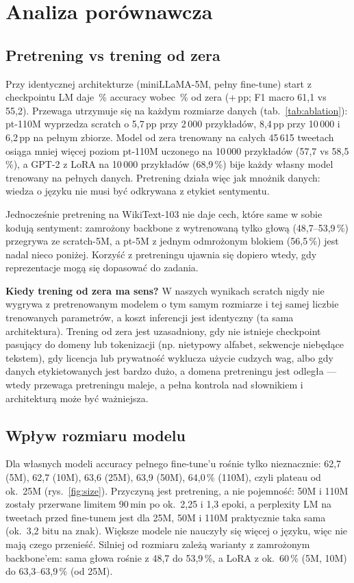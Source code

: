 \documentclass[11pt,a4paper]{article}
\begin{document}
\section{Analiza porównawcza}

\subsection{Pretrening vs trening od zera}
Przy identycznej architekturze (miniLLaMA-5M, pełny fine-tune) start z checkpointu LM daje
\resptFiveFullAcc\,\% accuracy wobec \resscratchAcc\,\% od zera (+\resgainPretrain\,pp; F1 macro 61,1
vs 55,2). Przewaga utrzymuje się na każdym rozmiarze danych (tab.~\ref{tab:ablation}): pt-110M
wyprzedza scratch o 5,7\,pp przy 2\,000 przykładów, 8,4\,pp przy 10\,000 i 6,2\,pp na pełnym zbiorze.
Model od zera trenowany na całych 45\,615 tweetach osiąga mniej więcej poziom pt-110M uczonego na
10\,000 przykładów (57,7 vs 58,5\,\%), a GPT-2 z LoRA na 10\,000 przykładów (68,9\,\%) bije każdy
własny model trenowany na pełnych danych. Pretrening działa więc jak mnożnik danych: wiedza
o języku nie musi być odkrywana z etykiet sentymentu.

Jednocześnie pretrening na WikiText-103 nie daje cech, które same w sobie kodują sentyment:
zamrożony backbone z wytrenowaną tylko głową (48,7--53,9\,\%) przegrywa ze scratch-5M, a pt-5M
z jednym odmrożonym blokiem (56,5\,\%) jest nadal nieco poniżej. Korzyść z pretreningu ujawnia się
dopiero wtedy, gdy reprezentacje mogą się dopasować do zadania.

\textbf{Kiedy trening od zera ma sens?} W naszych wynikach scratch nigdy nie wygrywa z pretrenowanym
modelem o tym samym rozmiarze i tej samej liczbie trenowanych parametrów, a koszt inferencji jest
identyczny (ta sama architektura). Trening od zera jest uzasadniony, gdy nie istnieje checkpoint
pasujący do domeny lub tokenizacji (np. nietypowy alfabet, sekwencje niebędące tekstem), gdy
licencja lub prywatność wyklucza użycie cudzych wag, albo gdy danych etykietowanych jest bardzo
dużo, a domena pretreningu jest odległa --- wtedy przewaga pretreningu maleje, a pełna kontrola
nad słownikiem i architekturą może być ważniejsza.

\subsection{Wpływ rozmiaru modelu}
Dla własnych modeli accuracy pełnego fine-tune'u rośnie tylko nieznacznie: 62,7 (5M), 62,7 (10M),
63,6 (25M), 63,9 (50M), 64,0\,\% (110M), czyli plateau od ok.\ 25M (rys.~\ref{fig:size}). Przyczyną
jest pretrening, a nie pojemność: 50M i 110M zostały przerwane limitem 90\,min po ok.\ 2,25 i 1,3
epoki, a perplexity LM na tweetach przed fine-tunem jest dla 25M, 50M i 110M praktycznie taka sama
(ok.\ 3,2 bitu na znak). Większe modele nie nauczyły się więcej o języku, więc nie mają czego
przenieść. Silniej od rozmiaru zależą warianty z zamrożonym backbone'em: sama głowa rośnie z 48,7
do 53,9\,\%, a LoRA z ok.\ 60\,\% (5M, 10M) do 63,3--63,9\,\% (od 25M).
\end{document}
